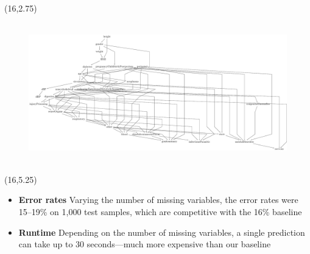 \documentclass[a0]{a0poster}
\begin{document}
\begin{textblock}{7.0}(16,2.75)

\begin{figure}[!h]
  \centering
  \hbox{
    \hspace{-2em}
    \includegraphics[width=1.1\textwidth]{bn-struct.pdf}
  }
  \label{fig3}
\end{figure}

\end{textblock}

\begin{textblock}{7.0}(16,5.25)

\begin{itemize}

  \item \textbf{Error rates} Varying the number of missing variables, the error rates were 15--19\% on 1,000 test samples, which are competitive with the 16\% baseline

  \item \textbf{Runtime} Depending on the number of missing variables, a single prediction can take up to 30 seconds---much more expensive than our baseline

\end{itemize}

\end{textblock}
\end{document}
